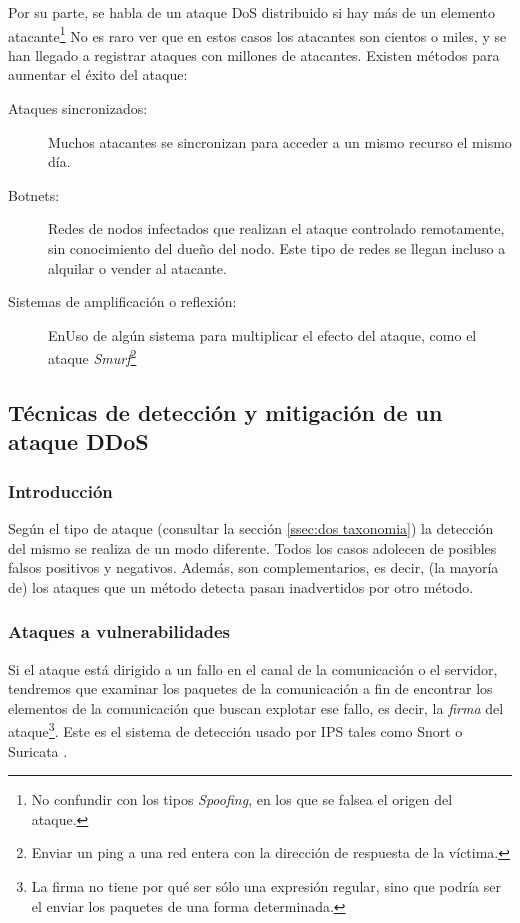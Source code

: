 Por su parte, se habla de un ataque \gls{DoS} distribuido si hay más de un elemento 
atacante\footnote{No confundir con los tipos \emph{Spoofing}, en los que se falsea el origen del ataque.} 
No es raro ver que en estos casos los atacantes son cientos o miles, y se han llegado a registrar ataques 
con millones de atacantes. Existen métodos para aumentar el éxito del ataque:
\begin{description}
  \item[Ataques sincronizados:] Muchos atacantes se sincronizan para acceder a un mismo recurso el
  mismo día.
  \item[Botnets:] Redes de nodos infectados que realizan el ataque controlado remotamente, sin conocimiento del
  dueño del nodo. Este tipo de redes se llegan incluso a alquilar o vender al atacante.
  \item[Sistemas de amplificación o reflexión:] EnUso de algún sistema para multiplicar el efecto del ataque,
  como el ataque \emph{Smurf}\footnote{Enviar un ping a una red entera con la dirección de respuesta 
  de la víctima.}
\end{description}

\subsection{Técnicas de detección y mitigación de un ataque DDoS}\label{sec:dos Deteccion y mitigación}
\subsubsection{Introducción}
Según el tipo de ataque (consultar la sección \ref{ssec:dos taxonomia}) la detección del mismo se realiza de un modo diferente.
Todos los casos adolecen de posibles falsos positivos y negativos. Además, son complementarios, es decir, (la mayoría de) los
ataques que un método detecta pasan inadvertidos por otro método.

\subsubsection{Ataques a vulnerabilidades}
Si el ataque está dirigido a un fallo en el canal de la comunicación o el servidor,
tendremos que examinar los paquetes de la comunicación a fin de encontrar los elementos de la
comunicación que buscan explotar ese fallo, es decir, la \emph{firma} del ataque\footnote{La firma no tiene
por qué ser sólo una expresión regular, sino que podría ser el enviar los paquetes de una forma determinada.}.
Este es el sistema de detección usado por IPS tales como Snort \cite{snort} o Suricata \cite{suricata}.

